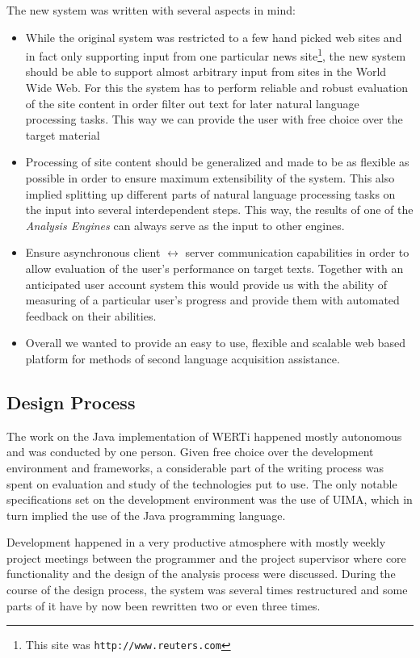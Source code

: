\documentclass[12pt]{article}
\begin{document}
The new system was written with several aspects in mind:
\begin{itemize}
  \item While the original system was restricted to a few hand picked web sites
    and in fact only supporting input from one particular news
    site\footnote{This site was \texttt{http://www.reuters.com}}, the new system
    should be able to support almost arbitrary input from sites in the World
    Wide Web. For this the system has to perform reliable and robust evaluation
    of the site content in order filter out text for later natural language
    processing tasks. This way we can provide the user with free choice over the
    target material %
  \item Processing of site content should be generalized and made to be as
    flexible as possible in order to ensure maximum extensibility of the
    system. This also implied splitting up different parts of natural
    language 
    processing tasks on the input into several interdependent steps. This way,
    the results of one of the \emph{Analysis Engines} can always serve as the
    input to other engines.
  \item Ensure asynchronous client $\leftrightarrow$ server communication capabilities in
    order to allow evaluation of the user's performance on target texts.
    Together with an anticipated user account system this would provide us with
    the ability of measuring of a particular user's progress and provide them
    with automated feedback on their abilities.
  \item Overall we wanted to provide an easy to use, flexible and scalable web 
    based platform for methods of second
    language acquisition assistance.
\end{itemize}

\subsection{Design Process} The work on the Java implementation of WERTi happened
mostly autonomous and was conducted by one person. Given free choice over the
development environment and frameworks, a considerable part of the writing
process was spent on evaluation and study of the technologies put to use. The
only notable specifications set on the development environment was the use of
UIMA, which in turn implied the use of the Java programming language.

Development happened in a very productive atmosphere with mostly weekly project
meetings between the programmer and the project supervisor where core
functionality and the design of the analysis process were discussed. During the
course of the design process, the system was several times restructured and some
parts of it have by now been rewritten two or even three times.
\end{document}
